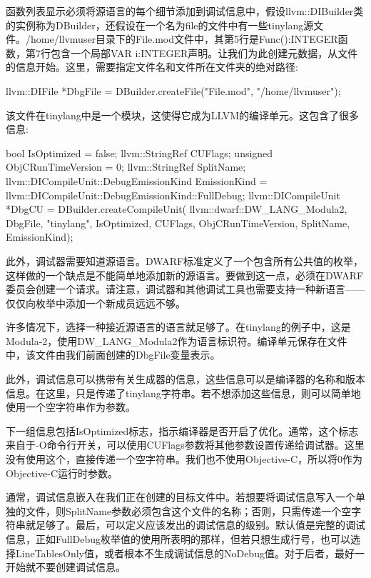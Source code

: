 函数列表显示必须将源语言的每个细节添加到调试信息中，假设llvm::DIBuilder类的实例称为DBuilder，还假设在一个名为file的文件中有一些tinylang源文件。/home/llvmuser目录下的File.mod文件中，其第5行是Func():INTEGER函数，第7行包含一个局部VAR i:INTEGER声明。让我们为此创建元数据，从文件的信息开始。这里，需要指定文件名和文件所在文件夹的绝对路径:

\begin{cpp}
llvm::DIFile *DbgFile = DBuilder.createFile("File.mod",
                                            "/home/llvmuser");
\end{cpp}

该文件在tinylang中是一个模块，这使得它成为LLVM的编译单元。这包含了很多信息:

\begin{cpp}
bool IsOptimized = false;
llvm::StringRef CUFlags;
unsigned ObjCRunTimeVersion = 0;
llvm::StringRef SplitName;
llvm::DICompileUnit::DebugEmissionKind EmissionKind =
    llvm::DICompileUnit::DebugEmissionKind::FullDebug;
llvm::DICompileUnit *DbgCU = DBuilder.createCompileUnit(
    llvm::dwarf::DW_LANG_Modula2, DbgFile, "tinylang",
    IsOptimized, CUFlags, ObjCRunTimeVersion, SplitName,
    EmissionKind);
\end{cpp}

此外，调试器需要知道源语言。DWARF标准定义了一个包含所有公共值的枚举，这样做的一个缺点是不能简单地添加新的源语言。要做到这一点，必须在DWARF委员会创建一个请求。请注意，调试器和其他调试工具也需要支持一种新语言——仅仅向枚举中添加一个新成员远远不够。

许多情况下，选择一种接近源语言的语言就足够了。在tinylang的例子中，这是Modula-2，使用DW\_LANG\_Modula2作为语言标识符。编译单元保存在文件中，该文件由我们前面创建的DbgFile变量表示。

此外，调试信息可以携带有关生成器的信息，这些信息可以是编译器的名称和版本信息。在这里，只是传递了tinylang字符串。若不想添加这些信息，则可以简单地使用一个空字符串作为参数。

下一组信息包括IsOptimized标志，指示编译器是否开启了优化。通常，这个标志来自于-O命令行开关，可以使用CUFlags参数将其他参数设置传递给调试器。这里没有使用这个，直接传递一个空字符串。我们也不使用Objective-C，所以将0作为Objective-C运行时参数。

通常，调试信息嵌入在我们正在创建的目标文件中。若想要将调试信息写入一个单独的文件，则SplitName参数必须包含这个文件的名称；否则，只需传递一个空字符串就足够了。最后，可以定义应该发出的调试信息的级别。默认值是完整的调试信息，正如FullDebug枚举值的使用所表明的那样，但若只想生成行号，也可以选择LineTablesOnly值，或者根本不生成调试信息的NoDebug值。对于后者，最好一开始就不要创建调试信息。


